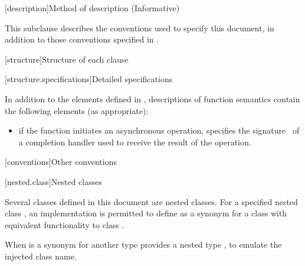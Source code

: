
[description]{Method of description (Informative)}

\pnum
 This subclause describes the conventions used to specify this document, in addition to those conventions specified in .


[structure]{Structure of each clause}


[structure.specifications]{Detailed specifications}

\pnum
In addition to the elements defined in , descriptions of function semantics contain the following elements (as appropriate):

\begin{itemize}
\item
\completionsig if the function initiates an asynchronous operation, specifies the  signature~ of a completion handler used to receive the result of the operation.
\end{itemize}




[conventions]{Other conventions}


[nested.class]{Nested classes}

\pnum
Several classes defined in this document are nested classes.
For a specified nested class , an implementation is permitted to
define  as a synonym for a class with equivalent functionality to
class . \begin{note} When  is a synonym for another
type  provides a nested type , to emulate the injected
class name. \end{note}


